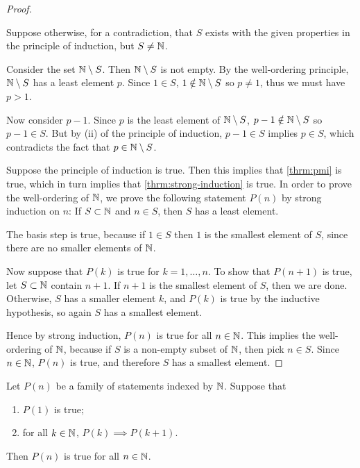 \begin{proof} \

\fbox{$\implies$} Suppose otherwise, for a contradiction, that $S$ exists with the given properties in the principle of induction, but $S\neq\mathbb N$. 

Consider the set $\mathbb N\setminus S$. Then $\mathbb N\setminus S$ is not empty. By the well-ordering principle, $\mathbb N\setminus S$ has a least element $p$. Since $1\in S$, $1\notin \mathbb N\setminus S$ so $p\neq 1$, thus we must have $p>1$. 

Now consider $p-1$. Since $p$ is the least element of $\mathbb N\setminus S$, $p-1\notin \mathbb N\setminus S$ so $p-1\in S$. But by (ii) of the principle of induction, $p-1\in S$ implies $p\in S$, which contradicts the fact that $p\in\mathbb N\setminus S$.

\fbox{$\impliedby$} Suppose the principle of induction is true. Then this implies that \ref{thrm:pmi} is true, which in turn implies that \ref{thrm:strong-induction} is true. In order to prove the well-ordering of $\mathbb N$, we prove the following statement $P(n)$ by strong induction on $n$: If $S\subset\mathbb N$ and $n\in S$, then $S$ has a least element.

The basis step is true, because if $1\in S$ then $1$ is the smallest element of $S$, since there are no smaller elements of $\mathbb N$.

Now suppose that $P(k)$ is true for $k=1,\dots,n$. To show that $P(n+1)$ is true, let $S\subset\mathbb N$ contain $n+1$. If $n+1$ is the smallest element of $S$, then we are done. Otherwise, $S$ has a smaller element $k$, and $P(k)$ is true by the inductive hypothesis, so again $S$ has a smallest element.

Hence by strong induction, $P(n)$ is true for all $n\in\mathbb N$. This implies the well-ordering of $\mathbb N$, because if $S$ is a non-empty subset of $\mathbb N$, then pick $n\in S$. Since $n\in\mathbb N$, $P(n)$ is true, and therefore $S$ has a smallest element.
\end{proof}

\begin{theorem}\label{thrm:pmi}
Let $P(n)$ be a family of statements indexed by $\mathbb N$. Suppose that 
\begin{enumerate}[label=(\roman*)]
\item $P(1)$ is true;
\item for all $k\in\mathbb N$, $P(k)\implies P(k+1)$.
\end{enumerate}
Then $P(n)$ is true for all $n\in\mathbb N$.
\end{theorem}

